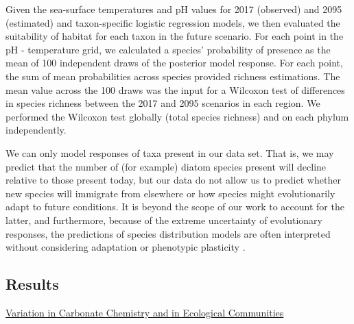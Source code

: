 \documentclass[11pt]{article}
\begin{document}
\begin{linenumbers}
Given the sea-surface temperatures and pH values for 2017 (observed) and 2095 (estimated) and taxon-specific logistic regression models, we then evaluated the suitability of habitat for each taxon in the future scenario. For each point in the pH - temperature grid, we calculated a species' probability of presence as the mean of 100 independent draws of the posterior model response. For each point, the sum of mean probabilities across species provided richness estimations. The mean value across the 100 draws was the input for a Wilcoxon test of differences in species richness between the 2017 and 2095 scenarios in each region. We performed the Wilcoxon test globally (total species richness) and on each phylum independently. 

We can only model responses of taxa present in our data set. That is, we may predict that the number of (for example) diatom species present will decline relative to those present today, but our data do not allow us to predict whether new species will immigrate from elsewhere or how species might evolutionarily adapt to future conditions. It is beyond the scope of our work to account for the latter, and furthermore, because of the extreme uncertainty of evolutionary responses, the predictions of species distribution models are often interpreted without considering adaptation or phenotypic plasticity \cite{moore2015present}. 



\subsection*{Results}
\underline{Variation in Carbonate Chemistry and in Ecological Communities}



\end{linenumbers}
\end{document}
